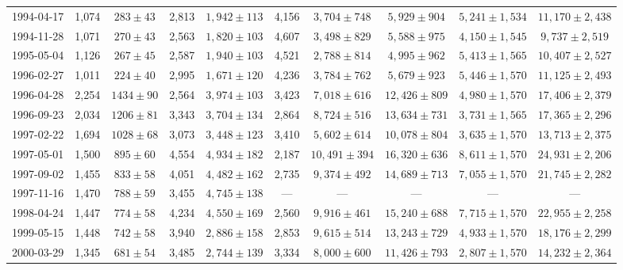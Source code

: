 \begin{landscape}
\begin{longtable}{cccccccccc}
{1994-04-17} & 1,074 & {$283  \pm  43$} & 2,813 & {$1,942 \pm 113$} & 4,156 & {$3,704 \pm 748$} & {$5,929 \pm 904$} & {$5,241 \pm 1,534$} & {$11,170 \pm 2,438$} \\
{1994-11-28} & 1,071 & {$270  \pm  43$} & 2,563 & {$1,820 \pm 103$} & 4,607 & {$3,498 \pm 829$} & {$5,588 \pm 975$} & {$4,150 \pm 1,545$} & {$9,737 \pm 2,519$} \\
{1995-05-04} & 1,126 & {$267  \pm  45$} & 2,587 & {$1,940 \pm 103$} & 4,521 & {$2,788 \pm 814$} & {$4,995 \pm 962$} & {$5,413 \pm 1,565$} & {$10,407 \pm 2,527$} \\
{1996-02-27} & 1,011 & {$224  \pm  40$} & 2,995 & {$1,671 \pm 120$} & 4,236 & {$3,784 \pm 762$} & {$5,679 \pm 923$} & {$5,446 \pm 1,570$} & {$11,125 \pm 2,493$} \\
{1996-04-28} & 2,254 & {$1434  \pm  90$} & 2,564 & {$3,974 \pm 103$} & 3,423 & {$7,018 \pm 616$} & {$12,426 \pm 809$} & {$4,980 \pm 1,570$} & {$17,406 \pm 2,379$} \\
{1996-09-23} & 2,034 & {$1206  \pm  81$} & 3,343 & {$3,704 \pm 134$} & 2,864 & {$8,724 \pm 516$} & {$13,634 \pm 731$} & {$3,731 \pm 1,565$} & {$17,365 \pm 2,296$} \\
{1997-02-22} & 1,694 & {$1028  \pm  68$} & 3,073 & {$3,448 \pm 123$} & 3,410 & {$5,602 \pm 614$} & {$10,078 \pm 804$} & {$3,635 \pm 1,570$} & {$13,713 \pm 2,375$} \\
{1997-05-01} & 1,500 & {$895  \pm  60$} & 4,554 & {$4,934 \pm 182$} & 2,187 & {$10,491 \pm 394$} & {$16,320 \pm 636$} & {$8,611 \pm 1,570$} & {$24,931 \pm 2,206$} \\
{1997-09-02} & 1,455 & {$833  \pm  58$} & 4,051 & {$4,482 \pm 162$} & 2,735 & {$9,374 \pm 492$} & {$14,689 \pm 713$} & {$7,055 \pm 1,570$} & {$21,745 \pm 2,282$} \\
{1997-11-16} & 1,470 & {$788  \pm  59$} & 3,455 & {$4,745 \pm 138$} & --- & --- & --- & --- & --- \\
{1998-04-24} & 1,447 & {$774  \pm  58$} & 4,234 & {$4,550 \pm 169$} & 2,560 & {$9,916 \pm 461$} & {$15,240 \pm 688$} & {$7,715 \pm 1,570$} & {$22,955 \pm 2,258$} \\
{1999-05-15} & 1,448 & {$742  \pm  58$} & 3,940 & {$2,886 \pm 158$} & 2,853 & {$9,615 \pm 514$} & {$13,243 \pm 729$} & {$4,933 \pm 1,570$} & {$18,176 \pm 2,299$} \\
{2000-03-29} & 1,345 & {$681  \pm  54$} & 3,485 & {$2,744 \pm 139$} & 3,334 & {$8,000 \pm 600$} & {$11,426 \pm 793$} & {$2,807 \pm 1,570$} & {$14,232 \pm 2,364$} \\

\end{longtable}
\end{landscape}
